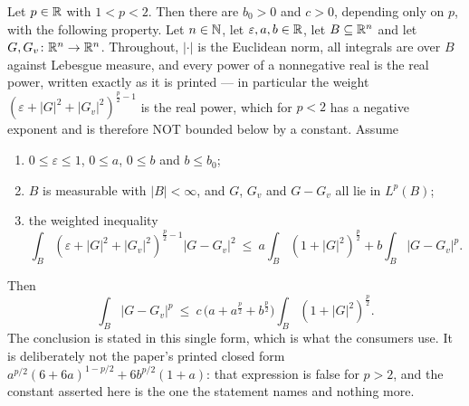 \begin{helper}
Let $p\in\mathbb{R}$ with $1<p<2$.  Then there are $b_0>0$ and $c>0$, depending only on
$p$, with the following property.  Let $n\in\mathbb{N}$, let
$\varepsilon,a,b\in\mathbb{R}$, let $B\subseteq\mathbb{R}^n$ and let
$G,G_v\colon\mathbb{R}^n\to\mathbb{R}^n$.  Throughout, $|\cdot|$ is the Euclidean norm, all
integrals are over $B$ against Lebesgue measure, and every power of a
nonnegative real is the real power, written exactly as it is printed --- in
particular the weight $(\varepsilon+|G|^2+|G_v|^2)^{\frac p2-1}$ is the real
power, which for $p<2$ has a negative exponent and is therefore NOT bounded
below by a constant.  Assume
\begin{enumerate}
\item[(H1)] $0\le\varepsilon\le1$, $0\le a$, $0\le b$ and $b\le b_0$;
\item[(H2)] $B$ is measurable with $|B|<\infty$, and $G$, $G_v$ and $G-G_v$ all
  lie in $L^p(B)$;
\item[(H3)] the weighted inequality
  \[
  \int_B(\varepsilon+|G|^2+|G_v|^2)^{\frac p2-1}|G-G_v|^2
  \ \le\ a\int_B(1+|G|^2)^{\frac p2}+b\int_B|G-G_v|^p .
  \]
\end{enumerate}
Then
\[
\int_B|G-G_v|^p\ \le\ c\,\bigl(a+a^{\frac p2}+b^{\frac p2}\bigr)
  \int_B(1+|G|^2)^{\frac p2}.
\]
The conclusion is stated in this single form, which is what the consumers use.
It is deliberately not the paper's printed closed form
$a^{p/2}(6+6a)^{1-p/2}+6b^{p/2}(1+a)$: that expression is false for $p>2$, and
the constant asserted here is the one the statement names and nothing more.
\end{helper}
